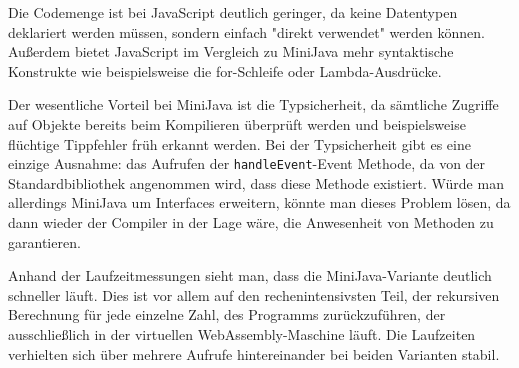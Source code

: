 Die Codemenge ist bei JavaScript deutlich geringer, da keine Datentypen deklariert werden müssen, sondern einfach "direkt verwendet" werden können. Außerdem bietet JavaScript im Vergleich zu MiniJava mehr syntaktische Konstrukte wie beispielsweise die for-Schleife oder Lambda-Ausdrücke. 

Der wesentliche Vorteil bei MiniJava ist die Typsicherheit, da sämtliche Zugriffe auf Objekte bereits beim Kompilieren überprüft werden und beispielsweise flüchtige Tippfehler früh erkannt werden. Bei der Typsicherheit gibt es eine einzige Ausnahme: das Aufrufen der \lstinline{handleEvent}-Event Methode, da von der Standardbibliothek angenommen wird, dass diese Methode existiert. Würde man allerdings MiniJava um Interfaces erweitern, könnte man dieses Problem lösen, da dann wieder der Compiler in der Lage wäre, die Anwesenheit von Methoden zu garantieren.

Anhand der Laufzeitmessungen sieht man, dass die MiniJava-Variante deutlich schneller läuft. Dies ist vor allem auf den rechenintensivsten Teil, der rekursiven Berechnung für jede einzelne Zahl, des Programms zurückzuführen, der ausschließlich in der virtuellen WebAssembly-Maschine läuft. Die Laufzeiten verhielten sich über mehrere Aufrufe hintereinander bei beiden Varianten stabil.
